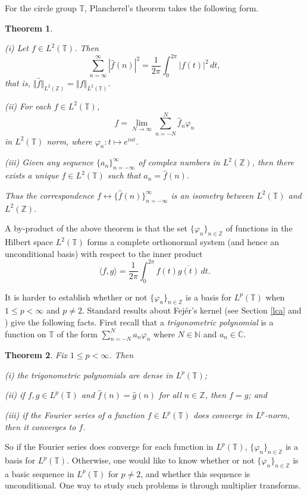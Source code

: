 \documentclass[mmath,12pt]{unswthesis}   %
\newcommand{\C}{\mathbb{C}}
\newcommand{\N}{\mathbb{N}}
\newcommand{\T}{\mathbb{T}}
\newcommand{\Z}{\mathbb{Z}}
\newcommand{\hatt}[1]{\widehat #1}
\def\ip<#1,#2>{\langle #1,#2 \rangle}
\def\norm#1{\left \Vert #1 \right \Vert}
\def\ssnorm#1{\Vert #1 \Vert}
\newtheorem{theorem}{Theorem}[section]
\numberwithin{equation}{section}
\begin{document}
For the circle group $\T$, Plancherel's theorem takes the following form.

\begin{theorem}\label{Plancherel for T}\cite[Theorem I.5.5]{Katznelson}

(i) Let $f\in L^2(\T)$. Then
\[\sum_{n=\infty}^{\infty}|\hatt{f}(n)|^2=
\frac{1}{2\pi}\int_0^{2\pi}|f(t)|^2\,dt,\]
that is, $\ssnorm{\hatt{f}}_{L^2(\Z)}=\norm{f}_{L^2(\T)}$.

(ii) For each $f\in L^2(\T)$,
\[f=\lim_{N\rightarrow\infty}\sum_{n=-N}^N\hatt{f}_n\varphi_n\]
in $L^2(\T)$ norm, where $\varphi_n:t\mapsto e^{int}$.

(iii) Given any sequence $\{a_n\}_{n=-\infty}^{\infty}$ of complex numbers in
$L^2(\Z)$, then there exists a unique $f\in L^2(\T)$ such that
$a_n=\hatt{f}(n)$.

Thus the correspondence $f\leftrightarrow\{\hatt{f}(n)\}_{n=-\infty}^{\infty}$
is an isometry between $L^2(\T)$ and $L^2(\Z)$.
\end{theorem}


A by-product of the above theorem is that the set $\{\varphi_n\}_{n\in\Z}$ of
functions in the Hilbert space $L^2(\T)$ forms a complete orthonormal system 
(and
hence an unconditional basis) with respect to the inner product
\[\ip<f,g>=\frac{1}{2\pi}\int_0^{2\pi}f(t)\overline{g(t)}\,dt.\]

It is harder to establish whether or not $\{\varphi_n\}_{n\in\Z}$ is a basis for
$L^p(\T)$ when $1\leq p<\infty$ and $p\neq2$. Standard results about Fej\'{e}r's
kernel (see Section \ref{lca} and \cite[I.2.6]{Katznelson}) give the following
facts. First recall that a {\em trigonometric polynomial} is a function on 
$\T$ of 
the form $\sum_{n=-N}^Na_n\varphi_n$ where $N\in\N$ and $a_n\in\C$.

\begin{theorem}\label{Fejer facts}
Fix $1\leq p<\infty$. Then

(i) the trigonometric polynomials are dense in $L^p(\T)$;

(ii) if $f,g\in L^p(\T)$ and $\hatt{f}(n)=\hatt{g}(n)$ for all $n\in\Z$,
then $f=g$; and


(iii) if the Fourier series of a function $f\in L^p(\T)$ does converge in
$L^p$-norm, then it converges to $f$.
\end{theorem}

So if the Fourier series does converge for each function in $L^p(\T)$,
$\{\varphi_n\}_{n\in\Z}$ is a basis for $L^p(\T)$. Otherwise,
one would like to know whether or not $\{\varphi_n\}_{n\in\Z}$ is a basic 
sequence in $L^p(\T)$ for $p\neq2$, and whether this sequence is unconditional.
One way to study such problems is through multiplier transforms.
\end{document}
